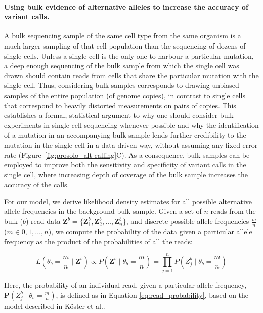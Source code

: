 \documentclass[12pt,inline]{wlscirep}
\newcommand{\Prob}{{\mathbf{P}}}
\begin{document}
\paragraph{Using bulk evidence of alternative alleles to increase the accuracy of variant calls.}
A bulk sequencing sample of the same cell type from the same organism is a much larger sampling of that cell population than the sequencing of dozens of single cells.
Unless a single cell is the only one to harbour a particular mutation, a deep enough sequencing of the bulk sample from which the single cell was drawn should contain reads from cells that share the particular mutation with the single cell.
Thus, considering bulk samples corresponds to drawing unbiased samples of the entire population (of genome copies), in contrast to single cells that correspond to heavily distorted measurements on pairs of copies.
This establishes a formal, statistical argument to why one should consider bulk experiments in single cell sequencing whenever possible and why the identification of a mutation in an accompanying bulk sample lends further credibility to the mutation in the single cell in a data-driven way, without assuming any fixed error rate (Figure~\ref{fig:prosolo_alt-calling}C).
As a consequence, bulk samples can be employed to improve both the sensitivity and specificity of variant calls in the single cell, where increasing depth of coverage of the bulk sample increases the accuracy of the calls. 

For our model, we derive likelihood density estimates for all possible alternative allele frequencies in the background bulk sample.
Given a set of $n$ reads from the bulk ($b$) read data $\boldsymbol{Z}^b  = \{ \boldsymbol{Z}_1^b, \boldsymbol{Z}_2^b, \dots, \boldsymbol{Z}_n^b \}$, and discrete possible allele frequencies $\frac{m}{n}$ ($m \in 0, 1, \dots, n$), we compute the probability of the data given a particular allele frequency as the product of the probabilities of all the reads:

\begin{equation}
 \label{eq:bulk-prob}
 L\left(\theta_b = \frac{m}{n} \mid \boldsymbol{Z}^b\right) \propto
 P\left(\boldsymbol{Z}^b \mid \theta_b = \frac{m}{n}\right) =
 \prod_{j=1}^n P\left(Z_j^b \mid \theta_b = \frac{m}{n} \right)
\end{equation}

Here, the probability of an individual read, given a particular allele frequency, $\Prob(Z_j^b \mid \theta_b = \frac{m}{n})$, is defined as in Equation \ref{eq:read_probability}, based on the model described in Köster et al.\cite{koster_varlociraptor_2020}.
\end{document}
